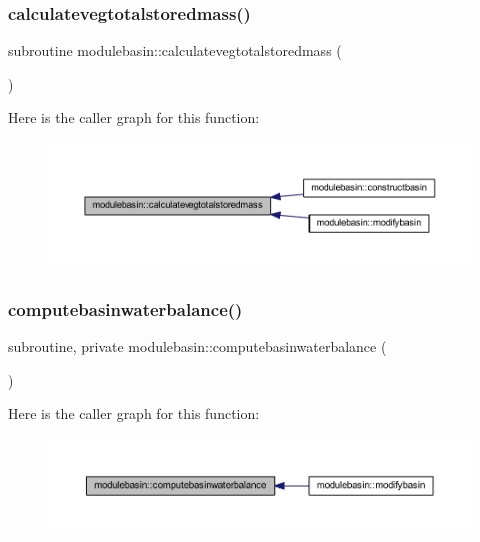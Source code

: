 \subsubsection{\texorpdfstring{calculatevegtotalstoredmass()}{calculatevegtotalstoredmass()}}
{\footnotesize\ttfamily subroutine modulebasin\+::calculatevegtotalstoredmass (\begin{DoxyParamCaption}{ }\end{DoxyParamCaption})\hspace{0.3cm}{\ttfamily [private]}}

Here is the caller graph for this function\+:\nopagebreak
\begin{figure}[H]
\begin{center}
\leavevmode
\includegraphics[width=350pt]{namespacemodulebasin_a00fd3009ac96d7478c5ad365f4438954_icgraph}
\end{center}
\end{figure}
\mbox{\label{namespacemodulebasin_ad852fa9f51f06a8aad01fbf81cfd7015}} 
\subsubsection{\texorpdfstring{computebasinwaterbalance()}{computebasinwaterbalance()}}
{\footnotesize\ttfamily subroutine, private modulebasin\+::computebasinwaterbalance (\begin{DoxyParamCaption}{ }\end{DoxyParamCaption})\hspace{0.3cm}{\ttfamily [private]}}

Here is the caller graph for this function\+:\nopagebreak
\begin{figure}[H]
\begin{center}
\leavevmode
\includegraphics[width=350pt]{namespacemodulebasin_ad852fa9f51f06a8aad01fbf81cfd7015_icgraph}
\end{center}
\end{figure}
\mbox{\label{namespacemodulebasin_a9ef4a0de552e03dfcc7dc780e6162af7}} 
